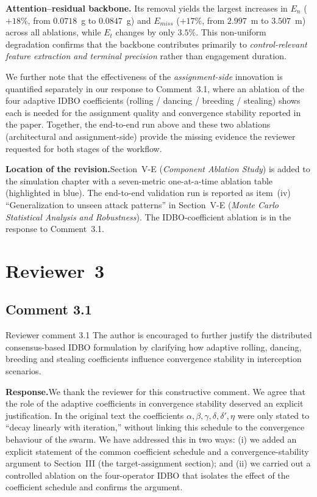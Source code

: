 \documentclass[11pt]{article}
\newcommand{\rsp}{\medskip\noindent\textbf{Response.}\quad}
\newcommand{\loc}{\medskip\noindent\textbf{Location of the revision.}\quad}
\begin{document}
\textbf{Attention--residual backbone.}  Its removal yields the largest increases in $E_n$
($+18\%$, from $0.0718$~g to $0.0847$~g) and $E_{miss}$ ($+17\%$, from $2.997$~m to
$3.507$~m) across all ablations, while $E_t$ changes by only $3.5\%$.  This non-uniform
degradation confirms that the backbone contributes primarily to
\emph{control-relevant feature extraction and terminal precision} rather than engagement
duration.

We further note that the effectiveness of the \emph{assignment-side} innovation is quantified
separately in our response to Comment~3.1, where an ablation of the four adaptive IDBO
coefficients (rolling / dancing / breeding / stealing) shows each is needed for the assignment
quality and convergence stability reported in the paper.  Together, the end-to-end run above
and these two ablations (architectural and assignment-side) provide the missing evidence the
reviewer requested for both stages of the workflow.

\loc Section~V-E (\emph{Component Ablation Study}) is added to the simulation chapter with a
seven-metric one-at-a-time ablation table (highlighted in blue).  The end-to-end validation
run is reported as item~(iv) ``Generalization to unseen attack patterns'' in Section~V-E
(\emph{Monte Carlo Statistical Analysis and Robustness}).  The IDBO-coefficient ablation is
in the response to Comment~3.1.

\clearpage

\section*{Reviewer~3}

\subsection*{Comment 3.1 }

\begin{reviewercomment}{Reviewer comment 3.1}
The author is encouraged to further justify the distributed consensus-based IDBO
formulation by clarifying how adaptive rolling, dancing, breeding and stealing
coefficients influence convergence stability in interception scenarios.
\end{reviewercomment}

\rsp We thank the reviewer for this constructive comment. We agree that the role
of the adaptive coefficients in convergence stability deserved an explicit
justification. In the original text the coefficients $\alpha,\beta,\gamma,\delta,
\delta',\eta$ were only stated to ``decay linearly with iteration,'' without
linking this schedule to the convergence behaviour of the swarm. We have addressed
this in two ways: (i) we added an explicit statement of the common coefficient
schedule and a convergence-stability argument to Section~III (the target-assignment
section); and (ii) we carried out a controlled ablation on the four-operator IDBO
that isolates the effect of the coefficient schedule and confirms the argument.
\end{document}

